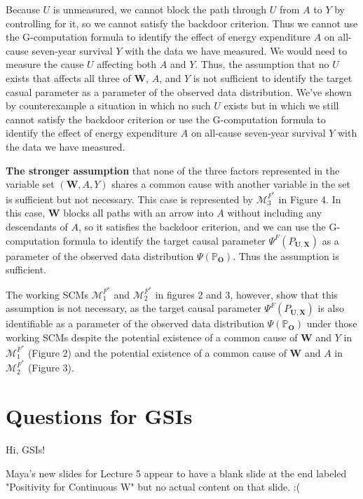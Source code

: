 \documentclass{article}\usepackage[]{graphicx}\usepackage[]{xcolor}
\begin{document}
Because $U$ is unmeasured, we cannot block the path through $U$ from $A$ to $Y$ by controlling for it, so we cannot satisfy the backdoor criterion. Thus we cannot use the G-computation formula to identify the effect of energy expenditure $A$ on all-cause seven-year survival $Y$ with the data we have measured. We would need to measure the cause $U$ affecting both $A$ and $Y$. Thus, the assumption that no $U$ exists that affects all three of $\bm{W}$, $A$, and $Y$ is not sufficient to identify the target casual parameter as a parameter of the observed data distribution. We've shown by counterexample a situation in which no such $U$ exists but in which we still cannot satisfy the backdoor criterion or use the G-computation formula to identify the effect of energy expenditure $A$ on all-cause seven-year survival $Y$ with the data we have measured.

\vspace{2mm}

\textbf{The stronger assumption} that none of the three factors represented in the variable set $(\bm{W}, A, Y)$ shares a common cause with another variable in the set is sufficient but not necessary. This case is represented by $\mathcal{M}^{F^*}_3$ in Figure 4. In this case, $\bm{W}$ blocks all paths with an arrow into $A$ without including any descendants of $A$, so it satisfies the backdoor criterion, and we can use the G-computation formula to identify the target causal parameter $\Psi^F(P_{\bm{U},\bm{X}})$ as a parameter of the observed data distribution $\Psi(\mathbb{P}_{\bm{O}})$. Thus the assumption is sufficient.

The working SCMs $\mathcal{M}^{F^*}_1$ and $\mathcal{M}^{F^*}_2$ in figures 2 and 3, however, show that this assumption is not necessary, as the target causal parameter $\Psi^F(P_{\bm{U},\bm{X}})$ is also identifiable as a parameter of the observed data distribution $\Psi(\mathbb{P}_{\bm{O}})$ under those working SCMs despite the potential existence of a common cause of $\bm{W}$ and $Y$ in $\mathcal{M}^{F^*}_1$ (Figure 2) and the potential existence of a common cause of $\bm{W}$ and $A$ in $\mathcal{M}^{F^*}_2$ (Figure 3).

\vspace{2mm}

\setlength{\leftskip}{0cm}

\section{Questions for GSIs}

Hi, GSIs!

Maya's new slides for Lecture 5 appear to have a blank slide at the end labeled "Positivity for Continuous W" but no actual content on that slide. :(
      
\end{document}
